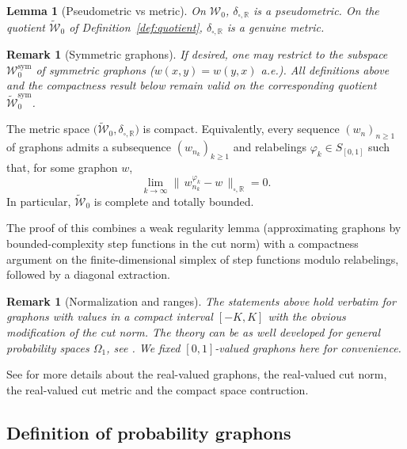 \documentclass[12pt,twoside,a4paper]{article}
\newtheorem{lemma}[theorem]{Lemma}
\newtheorem{remark}[theorem]{Remark}
\def\R{\mathbb{R}}
\newcommand{\InvRelabel}{S_{[0,1]}}
\begin{document}
\begin{lemma}[Pseudometric vs metric]
On $\mathcal{W}_0$, $\delta_{\square,\R}$ is a pseudometric. On the quotient
$\widetilde{\mathcal{W}}_0$ of Definition~\ref{def:quotient}, $\delta_{\square,\R}$ is a genuine
metric.
\end{lemma}

\begin{remark}[Symmetric graphons]\label{rem:symmetric_subspace}
If desired, one may restrict to the subspace $\mathcal{W}_0^{\mathrm{sym}}$ of symmetric graphons
($w(x,y)=w(y,x)$ a.e.). All definitions above and the compactness result below remain valid on the
corresponding quotient $\widetilde{\mathcal{W}}_0^{\mathrm{sym}}$.
\end{remark}

\begin{theorem}\label{thm:compactness}
The metric space $\big(\widetilde{\mathcal{W}}_0,\delta_{\square,\R}\big)$ is compact. Equivalently,
every sequence $(w_n)_{n\ge 1}$ of graphons admits a subsequence $(w_{n_k})_{k\ge 1}$ and
relabelings $\varphi_k\in\InvRelabel$ such that, for some graphon $w$,
\[
\lim_{k\to\infty}\big\|\,w_{n_k}^{\varphi_k}-w\,\big\|_{\square,\R}=0.
\]
In particular, $\widetilde{\mathcal{W}}_0$ is complete and totally bounded.
\end{theorem}

The proof of this combines a weak regularity lemma (approximating graphons by bounded-complexity step functions in the
cut norm) with a compactness argument on the finite-dimensional simplex of step functions modulo
relabelings, followed by a diagonal extraction.

\begin{remark}[Normalization and ranges]\label{rem:graphonrange}
The statements above hold verbatim for graphons with values in a compact interval $[-K,K]$ with the
obvious modification of the cut norm. The theory can be as well developed for general probability spaces $\Omega_1$, see \cite{jansonGraphonsCutNorm2013}. We fixed $[0,1]$-valued graphons here for convenience.
\end{remark}

See \cite{LovaszGraphLimits} for more details about the real-valued graphons, the real-valued cut norm, the real-valued cut metric and the compact space contruction.

\subsection{Definition of probability graphons}\label{section_def_graphons}
\end{document}
